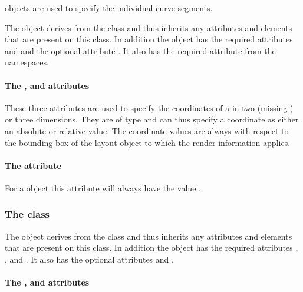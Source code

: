\RenderPoint objects are used to 
specify the individual curve segments.

The \RenderPoint object derives from the \SBase class and thus inherits
any attributes and elements that are present on this class.
In addition the \RenderPoint object has the required attributes  and  and the optional attribute . It also has the required attribute  from the  namespaces.

\paragraph{The \fixttspace{}, \fixttspace{} and \fixttspace{} attributes}

These three attributes are used to specify the coordinates of a  \RenderPoint in two (missing ) or three dimensions. They are of type \RelAbsVector and can thus specify a coordinate as either an absolute or relative value. The coordinate
values are always with respect to the bounding box of the layout object to which the
render information applies.

\paragraph{The \fixttspace{} attribute}

For a \RenderPoint object this attribute will always have the value .


\subsubsection{The  class}
\label{rendercubicbezier-class}


The \RenderCubicBezier object derives from the \RenderPoint class and
thus inherits any attributes and elements that are present on this
class.
In addition the \RenderCubicBezier object has the required attributes , ,  and . It also has the optional attributes  and .

\paragraph{The \fixttspace{}, \fixttspace{} and \fixttspace{} attributes}

